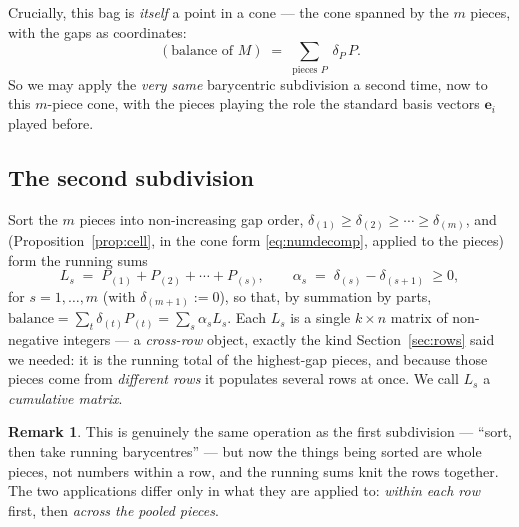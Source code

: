 \documentclass[11pt,a4paper]{article}
\theoremstyle{definition}
\newtheorem{remark}[definition]{Remark}
\theoremstyle{plain}
\newcommand{\bvec}[1]{\mathbf{#1}}
\begin{document}
Crucially, this bag is \emph{itself} a point in a cone --- the cone spanned by
the $m$ pieces, with the gaps as coordinates:
\[
   (\text{balance of }M)\;=\;\sum_{\text{pieces }P}\ \delta_P\, P .
\]
So we may apply the \emph{very same} barycentric subdivision a second time, now
to this $m$-piece cone, with the pieces playing the role the standard basis
vectors $\bvec e_i$ played before.

\subsection{The second subdivision}

Sort the $m$ pieces into non-increasing gap order, $\delta_{(1)}\ge\delta_{(2)}
\ge\cdots\ge\delta_{(m)}$, and (Proposition~\ref{prop:cell}, in the cone form
\eqref{eq:numdecomp}, applied to the pieces) form the running sums
\begin{equation}\label{eq:Ls}
   L_s \;=\; P_{(1)}+P_{(2)}+\cdots+P_{(s)},
   \qquad
   \alpha_s \;=\; \delta_{(s)}-\delta_{(s+1)}\ \ge0,
\end{equation}
for $s=1,\dots,m$ (with $\delta_{(m+1)}:=0$), so that, by summation by parts,
$\text{balance}=\sum_t\delta_{(t)}P_{(t)}=\sum_s\alpha_s L_s$. Each $L_s$ is a single $k\times n$
matrix of non-negative integers --- a \emph{cross-row} object, exactly the kind
Section~\ref{sec:rows} said we needed: it is the running total of the
highest-gap pieces, and because those pieces come from \emph{different rows} it
populates several rows at once. We call $L_s$ a \emph{cumulative matrix}.

\begin{remark}
This is genuinely the same operation as the first subdivision --- ``sort, then
take running barycentres'' --- but now the things being sorted are whole pieces,
not numbers within a row, and the running sums knit the rows together. The two
applications differ only in what they are applied to: \emph{within each row}
first, then \emph{across the pooled pieces}.
\end{remark}
\end{document}
